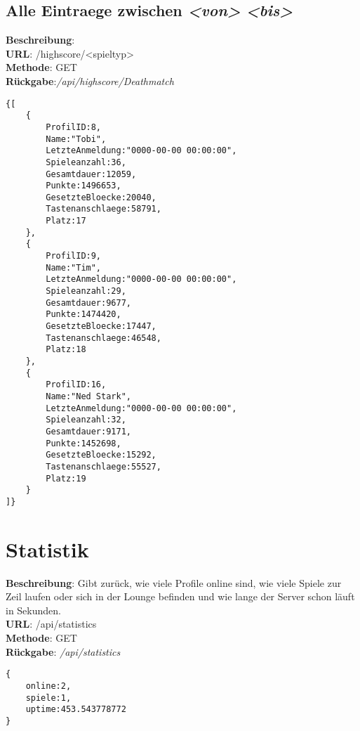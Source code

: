 \documentclass[11pt,a4paper]{article} %
\begin{document}
\subsection*{Alle Eintraege zwischen \textit{<von>} \textit{<bis>}}
\textbf{Beschreibung}: \\
\textbf{URL}: /highscore/<spieltyp>\\
\textbf{Methode}: GET\\
\textbf{Rückgabe}:\textcolor{kommi}{\textit{/api/highscore/Deathmatch}}\\
\begin{lstlisting}
{[
	{
		ProfilID:8,
		Name:"Tobi",
		LetzteAnmeldung:"0000-00-00 00:00:00",
		Spieleanzahl:36,
		Gesamtdauer:12059,
		Punkte:1496653,
		GesetzteBloecke:20040,
		Tastenanschlaege:58791,
		Platz:17
	},
	{
		ProfilID:9,
		Name:"Tim",
		LetzteAnmeldung:"0000-00-00 00:00:00",
		Spieleanzahl:29,
		Gesamtdauer:9677,
		Punkte:1474420,
		GesetzteBloecke:17447,
		Tastenanschlaege:46548,
		Platz:18
	},
	{
		ProfilID:16,
		Name:"Ned Stark",
		LetzteAnmeldung:"0000-00-00 00:00:00",
		Spieleanzahl:32,
		Gesamtdauer:9171,
		Punkte:1452698,
		GesetzteBloecke:15292,
		Tastenanschlaege:55527,
		Platz:19
	}
]}
\end{lstlisting}

\section*{Statistik}
\textbf{Beschreibung}: Gibt zurück, wie viele Profile online sind, wie viele Spiele zur Zeil laufen oder sich in der Lounge befinden und wie lange der Server schon läuft in Sekunden.\\
\textbf{URL}: /api/statistics\\
\textbf{Methode}: GET\\
\textbf{Rückgabe}: \textcolor{kommi}{\textit{/api/statistics}}\\
\begin{lstlisting}
{
	online:2,
	spiele:1,
	uptime:453.543778772
}
\end{lstlisting}
\end{document}
